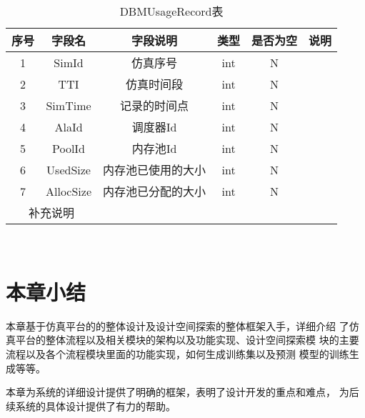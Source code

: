 \begin{table}[!h]
    \centering\normalsize
    \caption{DBMUsageRecord表}
    \begin{tabular}{|c|c|c|c|c|c|}
    \hline
    \textbf{序号} & \textbf{字段名} & \textbf{字段说明} & \textbf{类型} & \textbf{是否为空} & \textbf{说明} \\ \hline
    1           & SimId        & 仿真序号          & int         & N             &             \\ \hline
    2           & TTI          & 仿真时间段         & int         & N             &             \\ \hline
    3           & SimTime      & 记录的时间点        & int         & N             &             \\ \hline
    4           & AlaId        & 调度器Id         & int         & N             &             \\ \hline
    5           & PoolId       & 内存池Id         & int         & N             &             \\ \hline
    6           & UsedSize     & 内存池已使用的大小     & int         & N             &             \\ \hline
    7           & AllocSize    & 内存池已分配的大小     & int         & N             &             \\ \hline
    \multicolumn{2}{|c|}{补充说明} &               &             &               &             \\ \hline
    \end{tabular}
    \end{table}

~\\
\section{本章小结}
本章基于仿真平台的的整体设计及设计空间探索的整体框架入手，详细介绍
了仿真平台的整体流程以及相关模块的架构以及功能实现、设计空间探索模
块的主要流程以及各个流程模块里面的功能实现，如何生成训练集以及预测
模型的训练生成等等。

本章为系统的详细设计提供了明确的框架，表明了设计开发的重点和难点，
为后续系统的具体设计提供了有力的帮助。